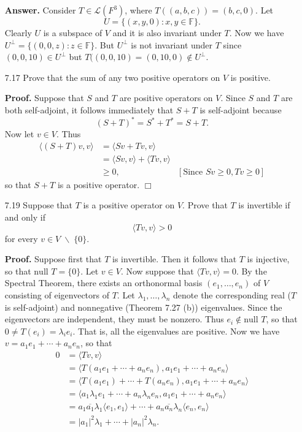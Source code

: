 \documentclass[9pt]{article}
\newcommand{\qed}{\hfill \ensuremath{\Box}}
\newcommand{\F}{\mathbb{F}}
\newcommand{\cyc}[1]{\langle #1 \rangle}
\begin{document}
\begin{enumerate}
      \textbf{Answer.} Consider $T \in \mathcal{L}(F^3)$, where
      $T((a, b, c)) = (b, c, 0)$. Let $$U = \{(x, y, 0) : x, y \in \F\}.$$ Clearly
      $U$ is a subspace of $V$ and it is also invariant under $T$. Now we have
      $U^{\perp} = \{(0, 0, z) : z \in \F\}$. But $U^{\perp}$ is not invariant under
      $T$ since $(0, 0, 10) \in U^{\perp}$ but $T((0, 0, 10) = (0, 10, 0) \notin U^{\perp}$.
   \item[7.17] Prove that the sum of any two positive operators on $V$ is
               positive.

      \textbf{Proof.} Suppose that $S$ and $T$ are positive operators on $V$.
      Since $S$ and $T$ are both self-adjoint, it follows immediately that
      $S + T$ is self-adjoint because
      $$(S+T)^* = S^*+T^* = S + T.$$
      Now let $v \in V$. Thus
      \begin{align*}
         \cyc{(S+T)v,v} &= \cyc{Sv + Tv, v} \\
            &= \cyc{Sv, v} + \cyc{Tv, v} \\
            &\ge 0, &[\text{Since } Sv \ge 0, Tv \ge 0]
      \end{align*}
      so that $S + T$ is a positive operator. \qed
   \item[7.19] Suppose that $T$ is a positive operator on $V$. Prove that $T$ is
               invertible if and only if
               $$\cyc{Tv, v} > 0$$
               for every $v \in V\;\backslash\;\{0\}$.

      \textbf{Proof.} Suppose first that $T$ is invertible. Then it follows that
      $T$ is injective, so that $\text{null }T = \{0\}$. Let $v \in V$. Now 
      suppose that $\cyc{Tv, v} = 0$. By the Spectral Theorem, there exists an 
      orthonormal basis $(e_1, \ldots, e_n)$  of $V$ consisting of eigenvectors
      of $T$. Let $\lambda_1, \ldots, \lambda_n$ denote the corresponding real
      ($T$ is self-adjoint) and nonnegative (Theorem 7.27 (b)) eigenvalues. 
      Since the eigenvectors are independent, they must be nonzero. Thus
      $e_i \notin \text{null }T$, so that $0 \neq T(e_i) = \lambda_ie_i$. That
      is, all the eigenvalues are positive. Now we have
      $v = a_1e_1 + \cdots + a_ne_n$, so that
      \begin{align*}
         0 &= \cyc{Tv, v} \\
           &= \cyc{T(a_1e_1 + \cdots + a_ne_n), a_1e_1 + \cdots + a_ne_n} \\
           &= \cyc{T(a_1e_1) + \cdots + T(a_ne_n), a_1e_1 + \cdots + a_ne_n} \\
           &= \cyc{a_1\lambda_1e_1 + \cdots + a_n\lambda_ne_n,
                   a_1e_1 + \cdots + a_ne_n} \\
           &= a_1\overline{a_1}\lambda_1\cyc{e_1, e_1} + \cdots +
              a_n\overline{a_n}\lambda_n\cyc{e_n, e_n} \\
           &= |a_1|^2\lambda_1 + \cdots + |a_n|^2\lambda_n.
      \end{align*}


\end{enumerate}
\end{document}
